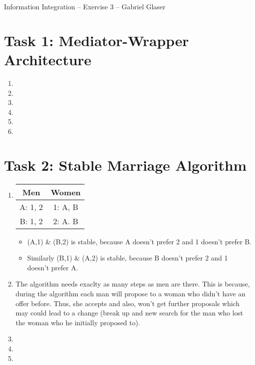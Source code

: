 \documentclass{scrartcl}
\begin{document}
	\begin{center}
		\LARGE
		Information Integration -- Exercise 3 -- Gabriel Glaser
	\end{center}
	
	\section*{Task 1: Mediator-Wrapper Architecture}
	\begin{enumerate}
		\item
		
		\item
		
		\item
		
		\item
		
		\item
		
		\item
		
	\end{enumerate}
	
	\section*{Task 2: Stable Marriage Algorithm}
	\begin{enumerate}
		\item\phantom{phantom}
		\begin{center}
			\begin{tabular}{c|c}
				Men & Women\\
				\hline
				A: 1, 2 & 1: A, B\\
				B: 1, 2 & 2: A. B
			\end{tabular}
		\end{center}
		\begin{itemize}
			\item (A,1) \& (B,2) is stable, because A doesn't prefer 2 and 1 doesn't prefer B.
			\item Similarly (B,1) \& (A,2) is stable, because B doesn't prefer 2 and 1 doesn't prefer A.
		\end{itemize}
		
		\item The algorithm needs exaclty as many steps as men are there.
		This is because, during the algorithm each man will propose to a woman who didn't have an offer before.
		Thus, she accepts and also, won't get further proposals which may could lead to a change (break up and new search for the man who lost the woman who he initially proposed to).
		
		\item
		
		\item
		
		\item
		
	\end{enumerate}
	
\end{document}
